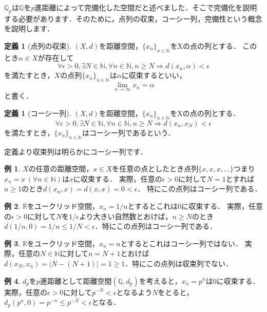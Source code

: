 \documentclass[uplatex]{jsarticle}
\newcommand{\Q}{\mathbb{Q}}
\newcommand{\R}{\mathbb{R}}
\theoremstyle{definition} %
\newtheorem{defi}[thm]{定義}
\newtheorem*{example*}{例}
\begin{document}
$\Q_p$は$\Q$を$p$進距離によって完備化した空間だと述べました．そこで完備化を説明する必要があります．そのために，点列の収束，コーシー列，完備性という概念を説明します．

\begin{oframed}\begin{defi}[点列の収束]
$(X, d)$を距離空間，$\{x_n\}_{n\in\mathbb{N}}$をXの点の列とする．
このとき$\alpha \in X$が存在して
\[
\forall \epsilon>0, \exists N\in\mathbb{N}, \forall n \in \mathbb{N}, n \geq N \Rightarrow d(x_n, \alpha) < \epsilon
\]
を満たすとき，$X$の点列$\{x_n\}_{n\in\mathbb{N}}$は$\alpha$に収束するといい，
\[
\lim_{n \to \infty} x_n = \alpha
\]
と書く．
\end{defi}\end{oframed}

\begin{oframed}\begin{defi}[コーシー列]
$(X, d)$を距離空間，$\{x_n\}_{n\in\mathbb{N}}$をXの点の列とする．
\[
\forall \epsilon>0, \exists N\in\mathbb{N}, \forall n \in \mathbb{N}, n \geq N \Rightarrow d(x_n, x_N) < \epsilon
\]
を満たすとき，$\{x_n\}_{n\in\mathbb{N}}$はコーシー列であるという．
\end{defi}\end{oframed}

定義より収束列は明らかにコーシー列です．

\begin{example*}
$X$の任意の距離空間，$x \in X$を任意の点としたとき点列$\{x, x, x, \dots\}$つまり$x_n = x \,(\forall n \in \mathbb{N})$は$x$に収束する．
実際，任意の$\epsilon > 0$に対して$N = 1$とすれば$n \geq 1$のとき$d(x_n, x) = d(x, x) = 0 < \epsilon$．
特にこの点列はコーシー列である．
\end{example*}

\begin{example*}
$\R$をユークリッド空間，$x_n = 1/n$とするとこれは$0$に収束する．
実際，任意の$\epsilon > 0$に対して$N$を$1 / \epsilon$より大きい自然数とおけば，$n \geq N$のとき$d(1/n, 0) = 1/n \leq 1/N < \epsilon$．特にこの点列はコーシー列である．
\end{example*}

\begin{example*}
$\R$をユークリッド空間，$x_n = n$とするとこれはコーシー列ではない．
実際，任意の$N \in \mathbb{N}$に対して$n = N+1$とおけば$d(x_N, x_{n}) = |N - (N+1)| = 1 \geq 1$．特にこの点列は収束列でない．
\end{example*}

\begin{example*}
$d_p$を$p$進距離として距離空間$(\Q, d_p)$を考えると，$x_n = p^n$は$0$に収束する．
実際，任意の$\epsilon > 0$に対して$p^{-N} < \epsilon$となるよう$N$をとると，$d_p(p^n, 0) = p^{-n} \leq p^{-N} < \epsilon$となる．
\end{example*}
\end{document}
